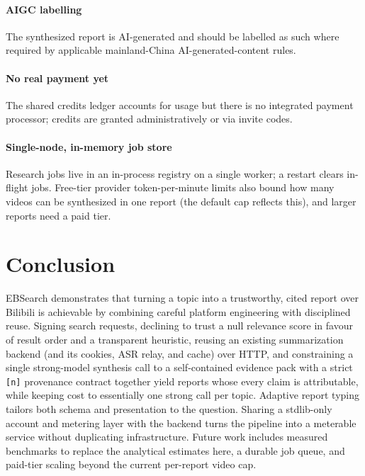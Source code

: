 \documentclass[conference]{IEEEtran}
\begin{document}
\paragraph{AIGC labelling} The synthesized report is AI-generated and should be
labelled as such where required by applicable mainland-China AI-generated-content
rules.

\paragraph{No real payment yet} The shared credits ledger accounts for usage but
there is no integrated payment processor; credits are granted administratively or
via invite codes.

\paragraph{Single-node, in-memory job store} Research jobs live in an in-process
registry on a single worker; a restart clears in-flight jobs. Free-tier provider
token-per-minute limits also bound how many videos can be synthesized in one
report (the default cap reflects this), and larger reports need a paid tier.

\section{Conclusion}
\label{sec:conclusion}

EBSearch demonstrates that turning a topic into a trustworthy, cited report over
Bilibili is achievable by combining careful platform engineering with disciplined
reuse. Signing search requests, declining to trust a null relevance score in
favour of result order and a transparent heuristic, reusing an existing
summarization backend (and its cookies, ASR relay, and cache) over HTTP, and
constraining a single strong-model synthesis call to a self-contained evidence
pack with a strict \texttt{[n]} provenance contract together yield reports whose
every claim is attributable, while keeping cost to essentially one strong call
per topic. Adaptive report typing tailors both schema and presentation to the
question. Sharing a stdlib-only account and metering layer with the backend turns
the pipeline into a meterable service without duplicating infrastructure. Future
work includes measured benchmarks to replace the analytical estimates here, a
durable job queue, and paid-tier scaling beyond the current per-report video cap.
\end{document}
